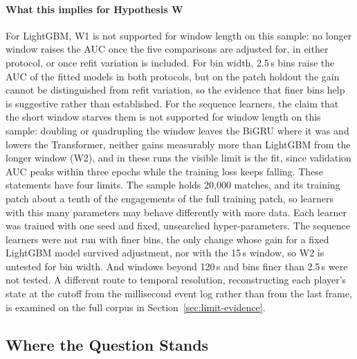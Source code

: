 \paragraph{What this implies for Hypothesis W}
For LightGBM, W1 is not supported for window length on this sample: no longer window raises the AUC once
the five comparisons are adjusted for, in either protocol, or once refit variation is included. For bin
width, 2.5\,s bins raise the AUC of the fitted models in both protocols, but on the patch holdout the gain
cannot be distinguished from refit variation, so the evidence that finer bins help is suggestive rather
than established. For the sequence learners, the claim that the short window starves them is not supported
for window length on this sample: doubling or quadrupling the window leaves the BiGRU where it was and
lowers the Transformer, neither gains measurably more than LightGBM from the longer window (W2), and in these runs the
visible limit is the fit, since validation AUC peaks within three epochs while the training loss keeps
falling. These statements have four limits. The sample holds 20,000 matches, and its training patch about
a tenth of the engagements of the full training patch, so learners with this many parameters may behave
differently with more data. Each learner was trained with one seed and fixed, unsearched hyper-parameters.
The sequence learners were not run with finer bins, the only change whose gain for a fixed LightGBM model
survived adjustment, nor with the 15\,s window, so W2 is untested for bin width. And windows beyond 120\,s
and bins finer than 2.5\,s were not tested. A different route to temporal resolution, reconstructing each
player's state at the cutoff from the millisecond event log rather than from the last frame, is examined on
the full corpus in Section~\ref{sec:limit-evidence}.

\subsection{Where the Question Stands}
\label{sec:learners-answer}

